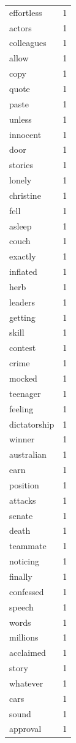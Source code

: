 \begin{tabular}{lr}
effortless & 1 \\
actors & 1 \\
colleagues & 1 \\
allow & 1 \\
copy & 1 \\
quote & 1 \\
paste & 1 \\
unless & 1 \\
innocent & 1 \\
door & 1 \\
stories & 1 \\
lonely & 1 \\
christine & 1 \\
fell & 1 \\
asleep & 1 \\
couch & 1 \\
exactly & 1 \\
inflated & 1 \\
herb & 1 \\
leaders & 1 \\
getting & 1 \\
skill & 1 \\
contest & 1 \\
crime & 1 \\
mocked & 1 \\
teenager & 1 \\
feeling & 1 \\
dictatorship & 1 \\
winner & 1 \\
australian & 1 \\
earn & 1 \\
position & 1 \\
attacks & 1 \\
senate & 1 \\
death & 1 \\
teammate & 1 \\
noticing & 1 \\
finally & 1 \\
confessed & 1 \\
speech & 1 \\
words & 1 \\
millions & 1 \\
acclaimed & 1 \\
story & 1 \\
whatever & 1 \\
cars & 1 \\
sound & 1 \\
approval & 1 \\

\end{tabular}
